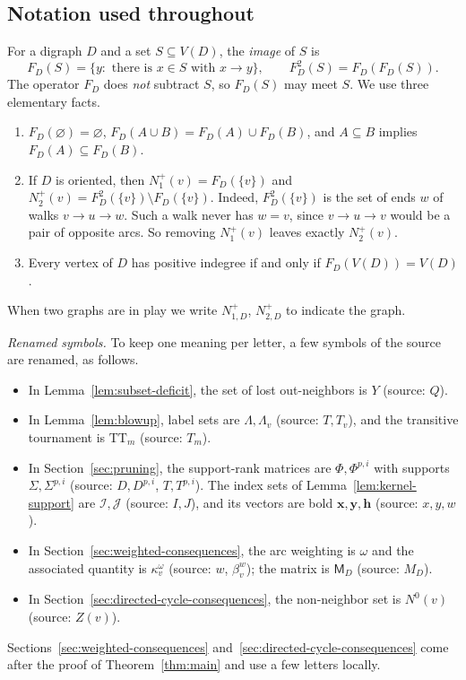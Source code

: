 \documentclass[11pt]{article}
\theoremstyle{remark}
\newcommand{\TT}{\mathrm{TT}}
\begin{document}
\subsection{Notation used throughout}\label{subsec:notation}

For a digraph \(D\) and a set \(S\subseteq V(D)\), the \emph{image} of $S$ is
\[
 F_D(S)=\{y:\text{ there is }x\in S\text{ with }x\to y\},
 \qquad F_D^2(S)=F_D(F_D(S)).
\]
The operator \(F_D\) does \emph{not} subtract \(S\), so $F_D(S)$ may meet $S$.
We use three elementary facts.
\begin{enumerate}[label=\textup{(F\arabic*)},leftmargin=3em]
\item\label{F1} $F_D(\varnothing)=\varnothing$,
 $F_D(A\cup B)=F_D(A)\cup F_D(B)$, and $A\subseteq B$ implies
 $F_D(A)\subseteq F_D(B)$.
\item\label{F2} If $D$ is oriented, then $N_1^+(v)=F_D(\{v\})$ and
 $N_2^+(v)=F_D^2(\{v\})\setminus F_D(\{v\})$.
 Indeed, $F_D^2(\{v\})$ is the set of ends $w$ of walks $v\to u\to w$.
 Such a walk never has $w=v$, since $v\to u\to v$ would be a pair of
 opposite arcs.  So removing $N_1^+(v)$ leaves exactly $N_2^+(v)$.
\item\label{F3} Every vertex of $D$ has positive indegree if and only if
 $F_D(V(D))=V(D)$.
\end{enumerate}
When two graphs are in play we write $N^+_{1,D}$, $N^+_{2,D}$ to indicate
the graph.

\emph{Renamed symbols.}  To keep one meaning per letter, a few symbols of the
source are renamed, as follows.
\begin{itemize}[nosep]
\item In Lemma~\ref{lem:subset-deficit}, the set of lost out-neighbors is $Y$
 (source: $Q$).
\item In Lemma~\ref{lem:blowup}, label sets are $\Lambda,\Lambda_v$
 (source: $T,T_v$), and the transitive tournament is $\TT_m$ (source: $T_m$).
\item In Section~\ref{sec:pruning}, the support-rank matrices are
 $\Phi,\Phi^{p,i}$ with supports $\Sigma,\Sigma^{p,i}$ (source: $D,D^{p,i}$,
 $T,T^{p,i}$).  The index sets of Lemma~\ref{lem:kernel-support} are
 $\mathcal I,\mathcal J$ (source: $I,J$), and its vectors are bold
 $\mathbf x,\mathbf y,\mathbf h$ (source: $x,y,w$).
\item In Section~\ref{sec:weighted-consequences}, the arc weighting is $\omega$
 and the associated quantity is $\kappa^\omega_v$ (source: $w$, $\beta_v^w$);
 the matrix is $\mathsf M_D$ (source: $M_D$).
\item In Section~\ref{sec:directed-cycle-consequences}, the non-neighbor set is
 $N^0(v)$ (source: $Z(v)$).
\end{itemize}
Sections~\ref{sec:weighted-consequences}
and~\ref{sec:directed-cycle-consequences} come after the proof of
Theorem~\ref{thm:main} and use a few letters locally.
\end{document}
